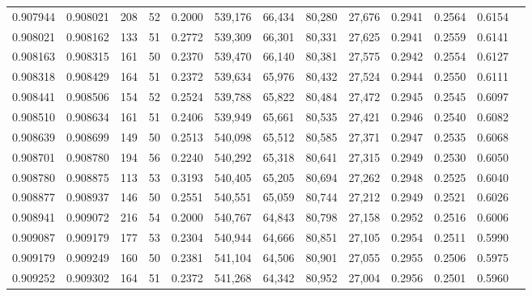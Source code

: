 \begin{tabular}{rrrrrrrrrrrrr}
0.907944 & 0.908021 &   208 &  52 &                                     0.2000 & 539,176 &  66,434 &  80,280 &  27,676 & 0.2941 & 0.2564 & 0.6154 \\
0.908021 & 0.908162 &   133 &  51 &                                     0.2772 & 539,309 &  66,301 &  80,331 &  27,625 & 0.2941 & 0.2559 & 0.6141 \\
0.908163 & 0.908315 &   161 &  50 &                                     0.2370 & 539,470 &  66,140 &  80,381 &  27,575 & 0.2942 & 0.2554 & 0.6127 \\
0.908318 & 0.908429 &   164 &  51 &                                     0.2372 & 539,634 &  65,976 &  80,432 &  27,524 & 0.2944 & 0.2550 & 0.6111 \\
0.908441 & 0.908506 &   154 &  52 &                                     0.2524 & 539,788 &  65,822 &  80,484 &  27,472 & 0.2945 & 0.2545 & 0.6097 \\
0.908510 & 0.908634 &   161 &  51 &                                     0.2406 & 539,949 &  65,661 &  80,535 &  27,421 & 0.2946 & 0.2540 & 0.6082 \\
0.908639 & 0.908699 &   149 &  50 &                                     0.2513 & 540,098 &  65,512 &  80,585 &  27,371 & 0.2947 & 0.2535 & 0.6068 \\
0.908701 & 0.908780 &   194 &  56 &                                     0.2240 & 540,292 &  65,318 &  80,641 &  27,315 & 0.2949 & 0.2530 & 0.6050 \\
0.908780 & 0.908875 &   113 &  53 &                                     0.3193 & 540,405 &  65,205 &  80,694 &  27,262 & 0.2948 & 0.2525 & 0.6040 \\
0.908877 & 0.908937 &   146 &  50 &                                     0.2551 & 540,551 &  65,059 &  80,744 &  27,212 & 0.2949 & 0.2521 & 0.6026 \\
0.908941 & 0.909072 &   216 &  54 &                                     0.2000 & 540,767 &  64,843 &  80,798 &  27,158 & 0.2952 & 0.2516 & 0.6006 \\
0.909087 & 0.909179 &   177 &  53 &                                     0.2304 & 540,944 &  64,666 &  80,851 &  27,105 & 0.2954 & 0.2511 & 0.5990 \\
0.909179 & 0.909249 &   160 &  50 &                                     0.2381 & 541,104 &  64,506 &  80,901 &  27,055 & 0.2955 & 0.2506 & 0.5975 \\
0.909252 & 0.909302 &   164 &  51 &                                     0.2372 & 541,268 &  64,342 &  80,952 &  27,004 & 0.2956 & 0.2501 & 0.5960 \\

\end{tabular}
